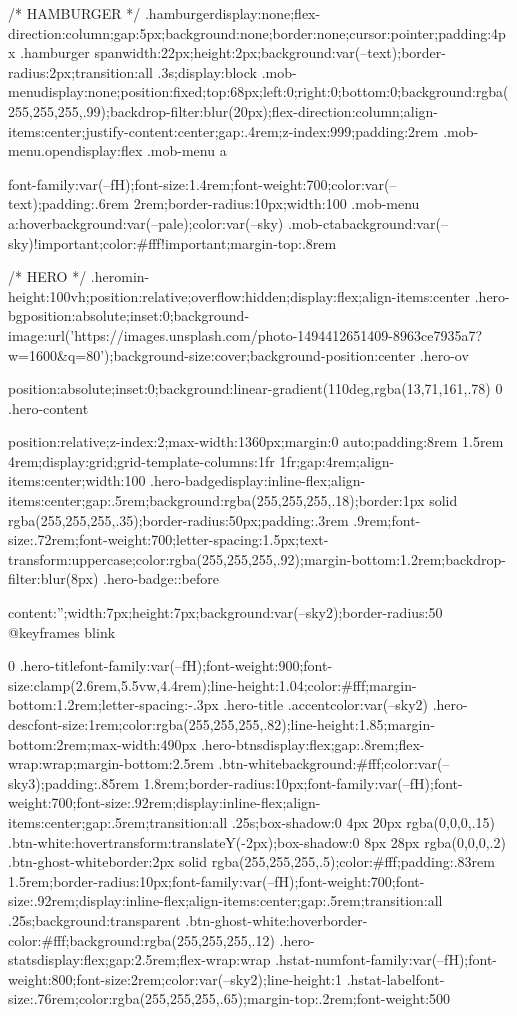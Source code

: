 {{{/* HAMBURGER */
.hamburger{display:none;flex-direction:column;gap:5px;background:none;border:none;cursor:pointer;padding:4px}
.hamburger span{width:22px;height:2px;background:var(--text);border-radius:2px;transition:all .3s;display:block}
.mob-menu{display:none;position:fixed;top:68px;left:0;right:0;bottom:0;background:rgba(255,255,255,.99);backdrop-filter:blur(20px);flex-direction:column;align-items:center;justify-content:center;gap:.4rem;z-index:999;padding:2rem}
.mob-menu.open{display:flex}
.mob-menu a{font-family:var(--fH);font-size:1.4rem;font-weight:700;color:var(--text);padding:.6rem 2rem;border-radius:10px;width:100%
.mob-menu a:hover{background:var(--pale);color:var(--sky)}
.mob-cta{background:var(--sky)!important;color:#fff!important;margin-top:.8rem}

/* HERO */
.hero{min-height:100vh;position:relative;overflow:hidden;display:flex;align-items:center}
.hero-bg{position:absolute;inset:0;background-image:url('https://images.unsplash.com/photo-1494412651409-8963ce7935a7?w=1600&q=80');background-size:cover;background-position:center}
.hero-ov{position:absolute;inset:0;background:linear-gradient(110deg,rgba(13,71,161,.78) 0%
.hero-content{position:relative;z-index:2;max-width:1360px;margin:0 auto;padding:8rem 1.5rem 4rem;display:grid;grid-template-columns:1fr 1fr;gap:4rem;align-items:center;width:100%
.hero-badge{display:inline-flex;align-items:center;gap:.5rem;background:rgba(255,255,255,.18);border:1px solid rgba(255,255,255,.35);border-radius:50px;padding:.3rem .9rem;font-size:.72rem;font-weight:700;letter-spacing:1.5px;text-transform:uppercase;color:rgba(255,255,255,.92);margin-bottom:1.2rem;backdrop-filter:blur(8px)}
.hero-badge::before{content:'';width:7px;height:7px;background:var(--sky2);border-radius:50%
@keyframes blink{0%
.hero-title{font-family:var(--fH);font-weight:900;font-size:clamp(2.6rem,5.5vw,4.4rem);line-height:1.04;color:#fff;margin-bottom:1.2rem;letter-spacing:-.3px}
.hero-title .accent{color:var(--sky2)}
.hero-desc{font-size:1rem;color:rgba(255,255,255,.82);line-height:1.85;margin-bottom:2rem;max-width:490px}
.hero-btns{display:flex;gap:.8rem;flex-wrap:wrap;margin-bottom:2.5rem}
.btn-white{background:#fff;color:var(--sky3);padding:.85rem 1.8rem;border-radius:10px;font-family:var(--fH);font-weight:700;font-size:.92rem;display:inline-flex;align-items:center;gap:.5rem;transition:all .25s;box-shadow:0 4px 20px rgba(0,0,0,.15)}
.btn-white:hover{transform:translateY(-2px);box-shadow:0 8px 28px rgba(0,0,0,.2)}
.btn-ghost-white{border:2px solid rgba(255,255,255,.5);color:#fff;padding:.83rem 1.5rem;border-radius:10px;font-family:var(--fH);font-weight:700;font-size:.92rem;display:inline-flex;align-items:center;gap:.5rem;transition:all .25s;background:transparent}
.btn-ghost-white:hover{border-color:#fff;background:rgba(255,255,255,.12)}
.hero-stats{display:flex;gap:2.5rem;flex-wrap:wrap}
.hstat-num{font-family:var(--fH);font-weight:800;font-size:2rem;color:var(--sky2);line-height:1}
.hstat-label{font-size:.76rem;color:rgba(255,255,255,.65);margin-top:.2rem;font-weight:500}

}}}}}}}}
